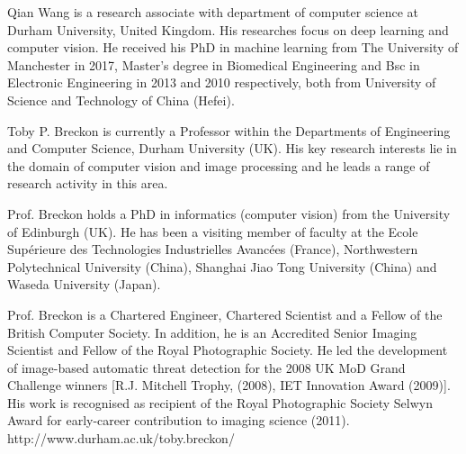 \documentclass[journal,comsoc]{IEEEtran}
\begin{document}
\begin{IEEEbiography}
{Qian Wang}
is a research associate with department of computer science at Durham University, United Kingdom. His researches focus on deep learning and computer vision. He received his PhD in machine learning from The University of Manchester in 2017, Master's degree in Biomedical Engineering and Bsc in Electronic Engineering in 2013 and 2010 respectively, both from University of Science and Technology of China (Hefei).
\end{IEEEbiography}

\begin{IEEEbiography}
{Toby P. Breckon}
is currently a Professor within the Departments of Engineering and Computer Science, Durham University (UK).  His key research interests lie in the domain of computer vision and image processing and he leads a range of research activity in this area.

Prof. Breckon holds a PhD in informatics (computer vision) from the University of Edinburgh (UK).  He has been a visiting member of faculty at the Ecole Supérieure des Technologies Industrielles Avancées (France), Northwestern Polytechnical University (China), Shanghai Jiao Tong University (China) and Waseda University (Japan).

Prof. Breckon is a Chartered Engineer, Chartered Scientist and a Fellow of the British Computer Society. In addition, he is an Accredited Senior Imaging Scientist and Fellow of the Royal Photographic Society. He led the development of image-based automatic threat detection for the 2008 UK MoD Grand Challenge winners [R.J. Mitchell Trophy, (2008), IET Innovation Award (2009)]. His work is recognised as recipient of the Royal Photographic Society Selwyn Award for early-career contribution to imaging science (2011). http://www.durham.ac.uk/toby.breckon/
\end{IEEEbiography}
\end{document}
